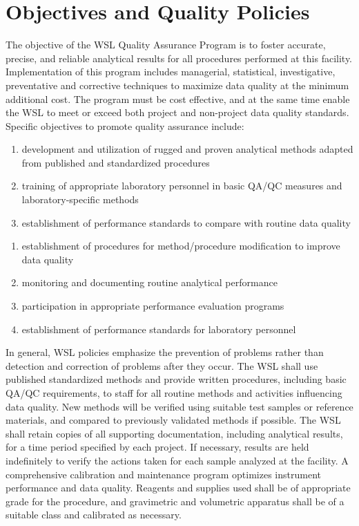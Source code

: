 \section{Objectives and Quality Policies }
The objective of the WSL Quality Assurance Program is to foster 
accurate, precise, and reliable analytical results for all procedures 
performed at this facility. Implementation of this program includes 
managerial, statistical, investigative, preventative and corrective 
techniques to maximize data quality at the minimum additional cost. The 
program must be cost effective, and at the same time enable the WSL to 
meet or exceed both project and non-project data quality standards. 
Specific objectives to promote quality assurance include: 

\begin{enumerate}
	\item development and utilization of rugged and proven analytical methods adapted from published and standardized procedures 
	\item training of appropriate laboratory personnel in basic QA/QC measures and laboratory-specific methods 
	\item establishment of performance standards to compare with routine data quality
\setcounter{numberedCntF}{\theenumi}
\end{enumerate}


\begin{enumerate}
\setcounter{enumi}{\thenumberedCntF}
	\item establishment of procedures for method/procedure modification to improve data quality
	\item monitoring and documenting routine analytical performance
	\item participation in appropriate performance evaluation programs
	\item establishment of performance standards for laboratory personnel 
\setcounter{numberedCntF}{\theenumi}
\end{enumerate}

\noindent
In general, WSL policies emphasize the prevention of problems rather 
than detection and correction of problems after they occur. The WSL 
shall use published standardized methods and provide written procedures, 
including basic QA/QC requirements, to staff for all routine methods and 
activities influencing data quality. New methods will be verified using 
suitable test samples or reference materials, and compared to previously 
validated methods if possible. The WSL shall retain copies of all 
supporting documentation, including analytical results, for a time 
period specified by each project. If necessary, results are held 
indefinitely to verify the actions taken for each sample analyzed at the 
facility. A comprehensive calibration and maintenance program optimizes 
instrument performance and data quality. Reagents and supplies used 
shall be of appropriate grade for the procedure, and gravimetric and 
volumetric apparatus shall be of a suitable class and calibrated as 
necessary. 

